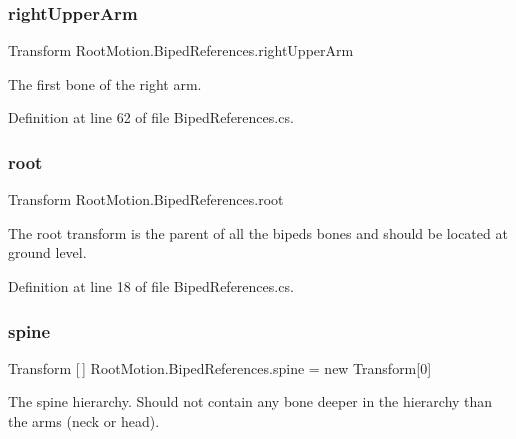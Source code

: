 \subsubsection{\texorpdfstring{right\+Upper\+Arm}{rightUpperArm}}
{\footnotesize\ttfamily Transform Root\+Motion.\+Biped\+References.\+right\+Upper\+Arm}



The first bone of the right arm. 



Definition at line 62 of file Biped\+References.\+cs.

\mbox{\label{class_root_motion_1_1_biped_references_a9881cc2a81314b442244e08c5b7d62fc}} 
\subsubsection{\texorpdfstring{root}{root}}
{\footnotesize\ttfamily Transform Root\+Motion.\+Biped\+References.\+root}



The root transform is the parent of all the biped\textquotesingle{}s bones and should be located at ground level. 



Definition at line 18 of file Biped\+References.\+cs.

\mbox{\label{class_root_motion_1_1_biped_references_aac4acc4a14c2ea6f05693afd5ff57c2c}} 
\subsubsection{\texorpdfstring{spine}{spine}}
{\footnotesize\ttfamily Transform \mbox{[}$\,$\mbox{]} Root\+Motion.\+Biped\+References.\+spine = new Transform\mbox{[}0\mbox{]}}



The spine hierarchy. Should not contain any bone deeper in the hierarchy than the arms (neck or head). 



